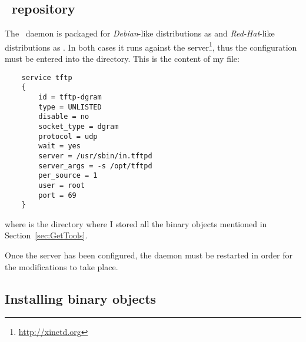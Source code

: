 
\subsection{ \TFTP\ repository }

    The \TFTPd\ daemon is packaged for \emph{Debian}-like
    distributions as  and \emph{Red-Hat}-like
    distributions as . In both cases it
    runs against the  server\footnote{
        \url{http://xinetd.org}
    }, thus the configuration must be entered into the
     directory. This is the content of my
     file:

\begin{lstlisting}
    service tftp
    {
        id = tftp-dgram
        type = UNLISTED
        disable = no
        socket_type = dgram
        protocol = udp
        wait = yes
        server = /usr/sbin/in.tftpd
        server_args = -s /opt/tftpd
        per_source = 1
        user = root
        port = 69
    }
\end{lstlisting}

    where  is the directory where I stored
    all the binary objects mentioned in
    Section~\ref{sec:GetTools}.

    Once the server has been configured, the 
    daemon must be restarted in order for the modifications to
    take place.

\subsection{ Installing binary objects }


